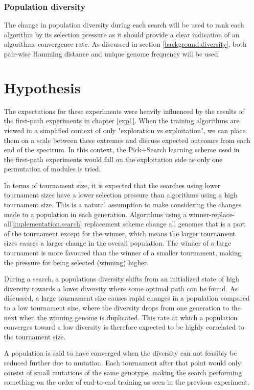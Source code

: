 \subsubsection{Population diversity}
The change in population diversity during each search will be used to rank each algorithm by its selection pressure as it should provide a clear indication of an algorithms convergence rate. As discussed in section \ref{background:diversity}, both pair-wise Hamming distance and unique genome frequency will be used.


\section{Hypothesis}
\label{exp2:hypothesis}
The expectations for these experiments were heavily influenced by the results of the first-path experiments in chapter \ref{exp1}. When the training algorithms are viewed in a simplified context of only "exploration vs exploitation", we can place them on a scale between these extremes and discuss expected outcomes from each end of the spectrum. In this context, the Pick+Search learning scheme used in the first-path experiments would fall on the exploitation side as only one permutation of modules is tried.

In terms of tournament size, it is expected that the searches using lower tournament sizes have a lower selection pressure than algorithms using a high tournament size. This is a natural assumption to make considering the changes made to a population in each generation. Algorithms using a winner-replace-all\ref{implementation.search} replacement scheme change all genomes that is a part of the tournament except for the winner, which means the larger tournament sizes causes a larger change in the overall population. The winner of a large tournament is more favoured than the winner of a smaller tournament, making the pressure for being selected (winning) higher. 

During a search, a populations diversity shifts from an initialized state of high diversity towards a lower diversity where some optimal path can be found. As discussed, a large tournament size causes rapid changes in a population compared to a low tournament size, where the diversity drops from one generation to the next when the winning genome is duplicated. This rate at which a population converges toward a low diversity is therefore expected to be highly correlated to the tournament size.

A population is said to have converged when the diversity can not feasibly be reduced further due to mutation. Each tournament after that point would only consist of small mutations of the same genotype, making the search performing something on the order of end-to-end training as seen in the previous experiment. 

